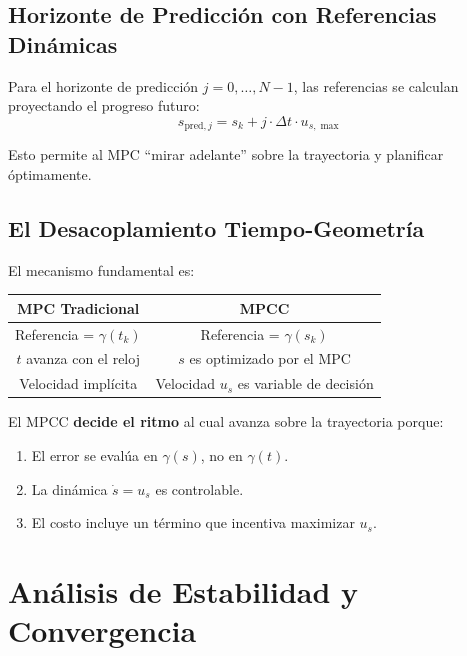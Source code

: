 \documentclass[11pt,a4paper]{article}
\begin{document}
\subsection{Horizonte de Predicción con Referencias Dinámicas}

Para el horizonte de predicción $j = 0, \ldots, N-1$, las referencias se calculan proyectando el progreso futuro:
\begin{equation}
    s_{\text{pred},j} = s_k + j \cdot \Delta t \cdot u_{s,\max}
\end{equation}

Esto permite al MPC ``mirar adelante'' sobre la trayectoria y planificar óptimamente.

\subsection{El Desacoplamiento Tiempo-Geometría}

El mecanismo fundamental es:

\begin{center}
\begin{tabular}{|c|c|}
\hline
\textbf{MPC Tradicional} & \textbf{MPCC} \\
\hline
Referencia = $\gamma(t_k)$ & Referencia = $\gamma(s_k)$ \\
$t$ avanza con el reloj & $s$ es optimizado por el MPC \\
Velocidad implícita & Velocidad $u_s$ es variable de decisión \\
\hline
\end{tabular}
\end{center}

El MPCC \textbf{decide el ritmo} al cual avanza sobre la trayectoria porque:
\begin{enumerate}
    \item El error se evalúa en $\gamma(s)$, no en $\gamma(t)$.
    \item La dinámica $\dot{s} = u_s$ es controlable.
    \item El costo incluye un término que incentiva maximizar $u_s$.
\end{enumerate}

\section{Análisis de Estabilidad y Convergencia}
\label{sec:stability}
\end{document}
